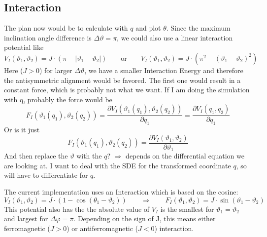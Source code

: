 	\subsection{Interaction}
	The plan now would be to calculate with $q$ and plot $\theta$.
	Since the maximum inclination angle difference is $\Delta \vartheta =	\pi$, we could also use a linear interaction potential like
	\begin{equation}
		V_I(\vartheta_1, \vartheta_2) = J \cdot \left(\pi - |\vartheta_1 - \vartheta_2|\right) \qquad \text{or}	\qquad  V_I(\vartheta_1, \vartheta_2) = J \cdot \left(\pi^2 - (\vartheta_1 - \vartheta_2)^2 \right)
	\end{equation}
	Here ($J > 0$) for larger $\Delta \vartheta$, we have a smaller Interaction Energy and therefore the antisymmetric alignment would be favored. The first one would result in a constant force, which is probably not what we want. If I am doing the simulation with q, probably the force would be
	\begin{equation}
		F_I(\vartheta_1(q_1), \vartheta_2(q_2)) = \frac{\partial V_I(\vartheta_1(q_1), \vartheta_2(q_2))}{\partial q_1} =	\frac{\partial V_I(q_1, q_2)}{\partial q_1}
	\end{equation}
	Or is it just
	\begin{equation}
		F_I(\vartheta_1(q_1), \vartheta_2(q_2)) =	\frac{\partial V_I(\vartheta_1, \vartheta_2)}{\partial \vartheta_1}
	\end{equation}
	And then replace the $\vartheta$ with the $q$? $\Rightarrow$ depends on the differential equation we are looking at. I want to deal with the SDE for the transformed coordinate $q$, so will have to differentiate for $q$.
	
	The current implementation uses an Interaction which is based on the cosine:
	\begin{equation}
		V_I(\vartheta_1, \vartheta_2) =	J \cdot (1 - \cos\left(\theta_1 - \vartheta_2\right)) \qquad \Rightarrow \qquad F_I(\vartheta_1, \vartheta_2) = J	\cdot \sin\left(\vartheta_1 - \vartheta_2\right)
	\end{equation}
	This potential also has the the absolute value of $V_I$ is the smallest for $\vartheta_1 =	\vartheta_2$ and largest for $\Delta \varphi =	\pi$. Depending on the sign of J, this means either ferromagnetic ($J>0$) or antiferromagnetic ($J < 0$) interaction.
	
